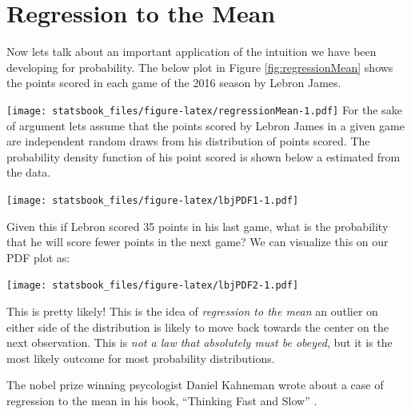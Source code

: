 \documentclass[
]{book}
\theoremstyle{definition}
\theoremstyle{definition}
\theoremstyle{definition}
\theoremstyle{definition}
\theoremstyle{remark}
\begin{document}
\hypertarget{regression-to-the-mean}{%
\section{Regression to the Mean}\label{regression-to-the-mean}}

Now lets talk about an important application of the intuition we have been developing for probability. The below plot in Figure \ref{fig:regressionMean} shows the points scored in each game of the 2016 season by Lebron James.

\texttt{[image: statsbook\_files/figure-latex/regressionMean-1.pdf]}
For the sake of argument lets assume that the points scored by Lebron James in a given game are independent random draws from his distribution of points scored. The probability density function of his point scored is shown below a estimated from the data.

\texttt{[image: statsbook\_files/figure-latex/lbjPDF1-1.pdf]}

Given this if Lebron scored 35 points in his last game, what is the probability that he will score fewer points in the next game? We can visualize this on our PDF plot as:

\texttt{[image: statsbook\_files/figure-latex/lbjPDF2-1.pdf]}

This is pretty likely! This is the idea of \emph{regression to the mean} an outlier on either side of the distribution is likely to move back towards the center on the next observation. This is \emph{not a law that absolutely must be obeyed}, but it is the most likely outcome for most probability distributions.

The nobel prize winning psycologist Daniel Kahneman wrote about a case of regression to the mean in his book, ``Thinking Fast and Slow'' \citep{kahneman2011thinking}.
\end{document}
